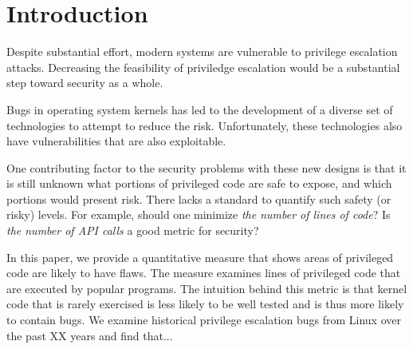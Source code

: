 \section{Introduction}
\label{sec.introduction}

Despite substantial effort, modern systems are vulnerable to privilege 
escalation attacks.  
Decreasing the feasibility of priviledge escalation would be a substantial
step toward security as a whole.

Bugs in operating system kernels has led to the development of a diverse set of
technologies to attempt to reduce the risk.    Unfortunately, these technologies also 
have vulnerabilities that are also exploitable.

One contributing factor to the security problems with these new designs is
that it is still unknown what portions of privileged code are
safe to expose, and which portions would present risk. There lacks a standard 
to quantify such safety (or risky) levels. For example, should one minimize 
\textit{the number of lines of code}?   Is \textit{the number of API 
calls} a good metric for security?    

In this paper, we provide a quantitative measure that shows
areas of privileged code are likely to have flaws.  
The measure examines lines of privileged code that are executed by popular 
programs.  The intuition behind this metric is that kernel code that is rarely
exercised is less likely to be well tested and is thus more likely to contain
bugs.  We examine historical privilege escalation bugs from Linux over
the past XX years and find that...

